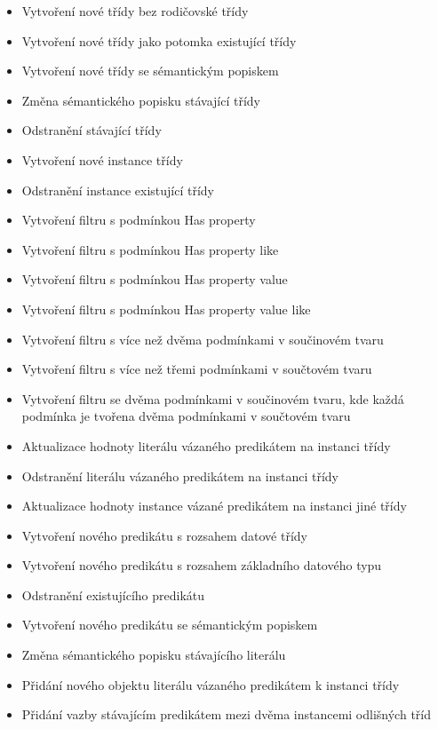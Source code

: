 \documentclass{projekt}
\begin{document}
\begin{itemize}
\item Vytvoření nové třídy bez rodičovské třídy
\item Vytvoření nové třídy jako potomka existující třídy
\item Vytvoření nové třídy se sémantickým popiskem 
\item Změna sémantického popisku stávající třídy
\item Odstranění stávající třídy
\vspace{0.45cm}
\item Vytvoření nové instance třídy
\item Odstranění instance existující třídy
\vspace{0.45cm}
\item Vytvoření filtru s podmínkou Has property
\item Vytvoření filtru s podmínkou Has property like
\item Vytvoření filtru s podmínkou Has property value
\item Vytvoření filtru s podmínkou Has property value like
\item Vytvoření filtru s více než dvěma podmínkami v součinovém tvaru
\item Vytvoření filtru s více než třemi podmínkami v součtovém tvaru
\vspace{0.45cm}
\item Vytvoření filtru se dvěma podmínkami v součinovém tvaru, kde každá podmínka je tvořena dvěma podmínkami v součtovém tvaru
\vspace{0.45cm}
\item Aktualizace hodnoty literálu vázaného predikátem na instanci třídy
\item Odstranění literálu vázaného predikátem na instanci třídy
\item Aktualizace hodnoty instance vázané predikátem na instanci jiné třídy
\vspace{0.45cm}
\item Vytvoření nového predikátu s rozsahem datové třídy
\item Vytvoření nového predikátu s rozsahem základního datového typu
\item Odstranění existujícího predikátu
\item Vytvoření nového predikátu se sémantickým popiskem
\item Změna sémantického popisku stávajícího literálu
\item Přidání nového objektu literálu vázaného predikátem k instanci třídy
\item Přidání vazby stávajícím predikátem mezi dvěma instancemi odlišných tříd
\end{itemize}
\end{document}
